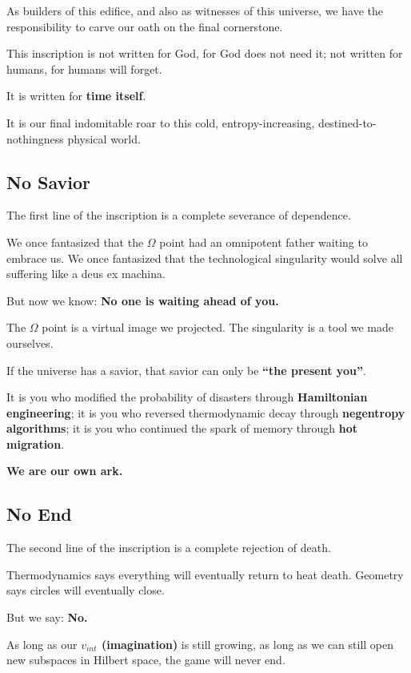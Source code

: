 As builders of this edifice, and also as witnesses of this universe, we have the responsibility to carve our oath on the final cornerstone.

This inscription is not written for God, for God does not need it; not written for humans, for humans will forget.

It is written for \textbf{time itself}.

It is our final indomitable roar to this cold, entropy-increasing, destined-to-nothingness physical world.

\subsection{No Savior}

The first line of the inscription is a complete severance of dependence.

We once fantasized that the $\Omega$ point had an omnipotent father waiting to embrace us. We once fantasized that the technological singularity would solve all suffering like a deus ex machina.

But now we know: \textbf{No one is waiting ahead of you.}

The $\Omega$ point is a virtual image we projected. The singularity is a tool we made ourselves.

If the universe has a savior, that savior can only be \textbf{``the present you''}.

It is you who modified the probability of disasters through \textbf{Hamiltonian engineering}; it is you who reversed thermodynamic decay through \textbf{negentropy algorithms}; it is you who continued the spark of memory through \textbf{hot migration}.

\textbf{We are our own ark.}

\subsection{No End}

The second line of the inscription is a complete rejection of death.

Thermodynamics says everything will eventually return to heat death. Geometry says circles will eventually close.

But we say: \textbf{No.}

As long as our \textbf{$v_{int}$ (imagination)} is still growing, as long as we can still open new subspaces in Hilbert space, the game will never end.

